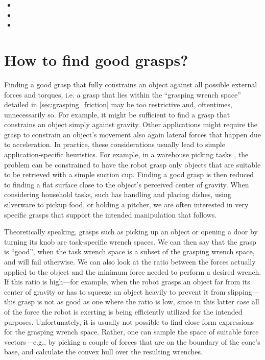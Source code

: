 \begin{itemize}
\item {}
\item {}
\item {}
\end{itemize}

\section{How to find good grasps? }

Finding a good grasp that fully constrains an object against all possible external forces and torques, i.e. a grasp that lies within the ``grasping wrench space'' detailed in \cref{sec:grasping_friction} may be too restrictive and, oftentimes, unnecessarily so.
For example, it might be sufficient to find a grasp that constrains an object simply against gravity.
Other applications might require the grasp to constrain an object's movement also again lateral forces that happen due to acceleration.
In practice, these considerations usually lead to simple application-specific heuristics. For example, in a warehouse picking tasks \cite{correll2016analysis}, the problem can be constrained to have the robot grasp only objects that are suitable to be retrieved with a simple suction cup. Finding a good grasp is then reduced to finding a flat surface close to the object's perceived center of gravity.
When considering household tasks, such has handling and placing dishes, using silverware to pickup food, or holding a pitcher, we are often interested in very specific grasps that support the intended manipulation that follows.

Theoretically speaking, grasps such as picking up an object or opening a door by turning its knob are task-specific wrench spaces. We can then say that the grasp is ``good'', when the task wrench space is a subset of the grasping wrench space, and will fail otherwise. We can also look at the ratio between the forces actually applied to the object and the minimum force needed to perform a desired wrench. If this ratio is high---for example, when the robot grasps an object far from its center of gravity or has to squeeze an object heavily to prevent it from slipping---this grasp is not as good as one where the ratio is low, since in this latter case all of the force the robot is exerting is being efficiently utilized for the intended purposes.
Unfortunately, it is usually not possible to find close-form expressions for the grasping wrench space. Rather, one can sample the space of suitable force vectors---e.g., by picking a couple of forces that are on the boundary of the cone's base, and calculate the convex hull over the resulting wrenches.

